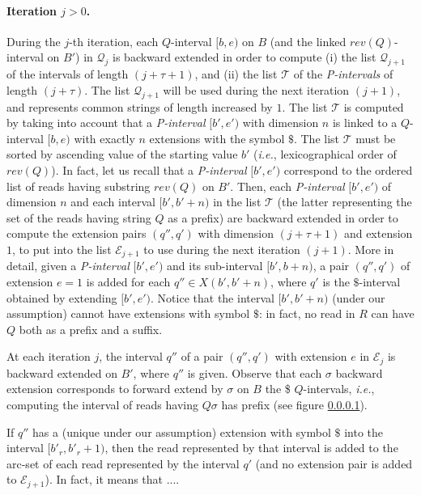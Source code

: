 \documentclass[runningheads,envcountsame,a4paper]{llncs}
\newcommand{\notaestesa}[2]{%
  {\sffamily {\bfseries #1}{\footnotesize #2}}%
  \marginpar{\framebox{\Large *}}%
}
\newcommand{\ie}{\textit{i.e.},\xspace}
\begin{document}
\paragraph{Iteration $j > 0$.}

During the $j$-th iteration, each $Q$-interval $[b, e)$ on $B$ (and the
linked $rev(Q)$-interval on $B'$) in $\mathcal{Q}_j$ is backward
extended in order to compute (i) the list $\mathcal{Q}_{j+1}$ of the
intervals of length $(j+\tau+1)$, and (ii) the list $\mathcal{T}$ of the
\emph{P-intervals} of length $(j+\tau)$.
The list $\mathcal{Q}_{j+1}$ will be used during the next iteration
$(j+1)$, and represents common strings of length increased by $1$.
The list $\mathcal{T}$ is computed by taking into account that a
\emph{P-interval} $[b', e')$ with dimension $n$ is linked to a
$Q$-interval $[b, e)$ with exactly $n$ extensions with the symbol $\$$.
The list $\mathcal{T}$ must be sorted by ascending value of the starting
value $b'$ (\ie lexicographical order of $rev(Q)$).
In fact, let us recall that a \emph{P-interval} $[b', e')$ correspond to
the ordered list of reads having substring $rev(Q)$ on $B'$.
Then, each \emph{P-interval} $[b', e')$ of dimension $n$ and each
interval $[b', b'+n)$ in the list $\mathcal{T}$ (the latter representing
the set of the reads having string $Q$ as a prefix) are backward
extended in order to compute the extension pairs $(q'', q')$ with
dimension $(j+\tau+1)$ and extension $1$, to put into the list
$\mathcal{E}_{j+1}$ to use during the next iteration $(j+1)$.
More in detail, given a \emph{P-interval} $[b',e')$ and its sub-interval
$[b',b+n)$, a pair $(q'',q')$ of extension $e=1$ is added for each $q''
\in X(b',b'+n)$, where $q'$ is the $\$$-interval obtained by extending
$[b',e')$.
Notice that the interval $[b', b'+n)$ (under our assumption) cannot have
extensions with symbol $\$$: in fact, no read in $R$ can have $Q$ both
as a prefix and a suffix.

At each iteration $j$, the interval $q''$ of a pair $(q'', q')$ with
extension $e$ in $\mathcal{E}_j$ is backward extended on $B'$, where
$q''$ is given.
Observe that each $\sigma$  backward extension corresponds to forward
extend by $\sigma$ on $B$ the  \$ $Q$-intervals, \ie computing the
interval of reads having $Q \sigma$ has prefix (see figure \ref{}).


If $q''$ has a (unique under our assumption) extension with symbol $\$$
into the interval $[b'_r, b'_r+1)$, then the read represented by that
interval is added to the arc-set of each read represented by the
interval $q'$ (and no extension pair is added to $\mathcal{E}_{j+1}$).
\notaestesa{Paola}{qua occorre dire il perchè} In fact, it means that ....
\end{document}
